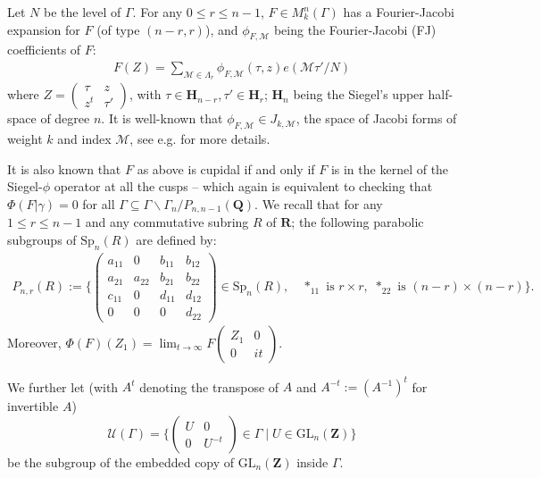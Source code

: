 \documentclass[12pt]{amsart}
\numberwithin{equation}{section}
\theoremstyle{plain}
\theoremstyle{definition}
\newcommand*{\Q}{\mathbf{Q}}
\newcommand{\mf}{\mathbf}
\newcommand{\q}{\quad}
\newcommand{\mc}{\mathcal}
\newcommand{\mrm}{\mathrm}
\newcommand{\R}{\mf{R}}
\newcommand{\glnz}{\mrm{GL}_n( \mf Z)}
\newcommand{\mkngam}{M^n_k(\Gamma)}
\newcommand{\sumn}{\sum \nolimits}
\newcommand{\psmb}{\left( \begin{smallmatrix}}
\newcommand{\psme}{ \end{smallmatrix} \right) }
\begin{document}
Let $N$ be the level of $\Gamma$. For any $0 \le r \le n-1$, $F \in \mkngam$ has a Fourier-Jacobi expansion for $F$ (of type $(n-r,r)$), and $\phi_{F,\mc M}$ being the Fourier-Jacobi (FJ) coefficients of $F$:
\begin{align} \label{fj-exp}
    F(Z) = \sumn_{\mc M \in \Lambda_r} \phi_{F,\mc M}(\tau,z) e(\mc M \tau'/N)
\end{align}
where $Z= \psmb \tau & z \\ z^t & \tau' \psme$, with $\tau \in \mf H_{n-r}, \tau' \in \mf H_r$; $\mf H_n$ being the Siegel's upper half-space of degree $n$. It is well-known that $\phi_{F,\mc M} \in J_{k, \mc M}$, the space of Jacobi forms of weight $k$ and index $\mc M$, see e.g. \cite{ziegler} for more details.

It is also known that $F$ as above is cupidal if and only if $F$ is in the kernel of the Siegel-$\phi$ operator at all the cusps -- which again is equivalent to checking that $\Phi(F|\gamma)=0$ for all $\Gamma \subseteq \Gamma \backslash \Gamma_n / P_{n,n-1}(\Q)$. We recall that for any $1 \le r \le n-1$ and any  commutative subring $R$ of $\R$; the following parabolic subgroups of $\mrm{Sp}_n(R)$ are defined by: 
  \begin{align} \label{pnr}
   P_{n,r}(R):= \{ \begin{pmatrix}
    a_{11} & 0 & b_{11} & b_{12} \\
    a_{21} & a_{22} & b_{21} & b_{22}\\
    c_{11} & 0 & d_{11} & d_{12}\\
    0 & 0 & 0 & d_{22}
    \end{pmatrix} \in \mrm{Sp}_n(R),  \q *_{11} \text{ is } r \times r, \, \, *_{22} \text{ is } (n-r) \times (n-r) \} .
\end{align}
Moreover, $\Phi (F)(Z_1) = \lim_{t \to \infty} F\psmb Z_1 & 0 \\ 0 & it \psme$.

We further let (with $A^t$ denoting the transpose of $A$ and $A^{-t}:=(A^{-1})^t$ for invertible $A$)
\begin{equation}
    \mathscr U(\Gamma)=\{  \psmb U & 0 \\ 0 & U^{-t} \psme \in \Gamma \mid U \in \glnz \}
\end{equation}
be the subgroup of the embedded copy of $\glnz$ inside $\Gamma$.
\end{document}
